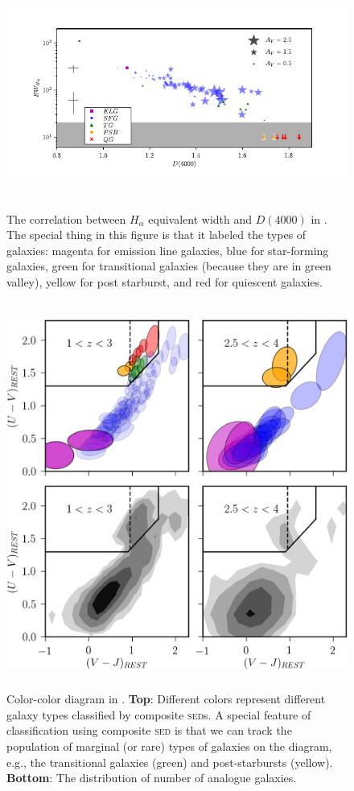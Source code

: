 \documentclass{ar-1col}
\begin{document}
\begin{figure}
    \includegraphics[width=6in, height=3in]{images/Forrest_Ha_D4000.pdf}
    \caption{The correlation between $H_\alpha$ equivalent width and $D(4000)$ in \citet{Forrest2018}. The special thing in this figure is that it labeled the types of galaxies: magenta for emission line galaxies, blue for star-forming galaxies, green for transitional galaxies (because they are in green valley), yellow for post starburst, and red for quiescent galaxies. }
    \label{fig:correlation}
\end{figure}


\begin{figure}
    \includegraphics[width=5in, height=5in]{images/color-color.png}
    \caption{Color-color diagram in \citet{Forrest2018}. \textbf{Top}: Different colors represent different galaxy types classified by composite \textsc{sed}s. A special feature of classification using composite \textsc{sed} is that we can track the population of marginal (or rare) types of galaxies on the diagram, e.g., the transitional galaxies (green) and post-starbursts (yellow). \textbf{Bottom}: The distribution of number of analogue galaxies.}
    \label{fig:color-color}
\end{figure}
\end{document}

